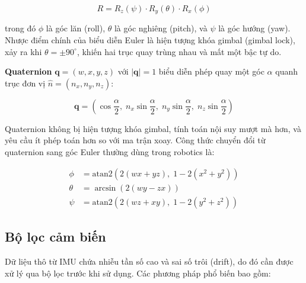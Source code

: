 \begin{equation}
    R = R_z(\psi) \cdot R_y(\theta) \cdot R_x(\phi)
\end{equation}

trong đó $\phi$ là góc lăn (roll), $\theta$ là góc nghiêng (pitch), và $\psi$ là góc hướng (yaw). Nhược điểm chính của biểu diễn Euler là hiện tượng khóa gimbal (gimbal lock), xảy ra khi $\theta = \pm 90^\circ$, khiến hai trục quay trùng nhau và mất một bậc tự do.

\textbf{Quaternion} $\mathbf{q} = (w, x, y, z)$ với $|\mathbf{q}| = 1$ biểu diễn phép quay một góc $\alpha$ quanh trục đơn vị $\hat{n} = (n_x, n_y, n_z)$:

\begin{equation}
    \mathbf{q} = \left(\cos\frac{\alpha}{2},\; n_x \sin\frac{\alpha}{2},\; n_y \sin\frac{\alpha}{2},\; n_z \sin\frac{\alpha}{2}\right)
\end{equation}

Quaternion không bị hiện tượng khóa gimbal, tính toán nội suy mượt mà hơn, và yêu cầu ít phép toán hơn so với ma trận xoay. Công thức chuyển đổi từ quaternion sang góc Euler thường dùng trong robotics là:

\begin{align}
    \phi   &= \text{atan2}\left(2(w x + y z),\; 1 - 2(x^2 + y^2)\right) \\
    \theta &= \arcsin\left(2(w y - z x)\right) \\
    \psi   &= \text{atan2}\left(2(w z + x y),\; 1 - 2(y^2 + z^2)\right)
\end{align}

\subsection{Bộ lọc cảm biến}

Dữ liệu thô từ IMU chứa nhiễu tần số cao và sai số trôi (drift), do đó cần được xử lý qua bộ lọc trước khi sử dụng. Các phương pháp phổ biến bao gồm:

